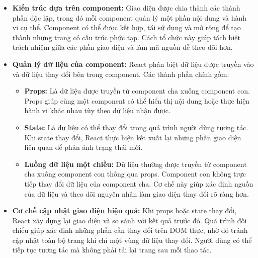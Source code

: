 \begin{itemize}
    \item \textbf{Kiến trúc dựa trên component:} Giao diện được chia thành các thành phần độc lập, trong đó mỗi component quản lý một phần nội dung và hành vi cụ thể. Component có thể được kết hợp, tái sử dụng và mở rộng để tạo thành những trang có cấu trúc phức tạp. Cách tổ chức này giúp tách biệt trách nhiệm giữa các phần giao diện và làm mã nguồn dễ theo dõi hơn.


    \item \textbf{Quản lý dữ liệu của component:} React phân biệt dữ liệu được truyền vào và dữ liệu thay đổi bên trong component. Các thành phần chính gồm:
    \begin{itemize}
        \item \textbf{Props:} Là dữ liệu được truyền từ component cha xuống component con. Props giúp cùng một component có thể hiển thị nội dung hoặc thực hiện hành vi khác nhau tùy theo dữ liệu nhận được.

        \item \textbf{State:} Là dữ liệu có thể thay đổi trong quá trình người dùng tương tác. Khi state thay đổi, React thực hiện kết xuất lại những phần giao diện liên quan để phản ánh trạng thái mới.

        \item \textbf{Luồng dữ liệu một chiều:} Dữ liệu thường được truyền từ component cha xuống component con thông qua props. Component con không trực tiếp thay đổi dữ liệu của component cha. Cơ chế này giúp xác định nguồn của dữ liệu và theo dõi nguyên nhân làm giao diện thay đổi rõ ràng hơn.
    \end{itemize}

    \item \textbf{Cơ chế cập nhật giao diện hiệu quả:} Khi props hoặc state thay đổi, React xây dựng lại giao diện và so sánh với kết quả trước đó. Quá trình đối chiếu giúp xác định những phần cần thay đổi trên DOM thực, nhờ đó tránh cập nhật toàn bộ trang khi chỉ một vùng dữ liệu thay đổi. Người dùng có thể tiếp tục tương tác mà không phải tải lại trang sau mỗi thao tác.
    \clearpage


\end{itemize}
